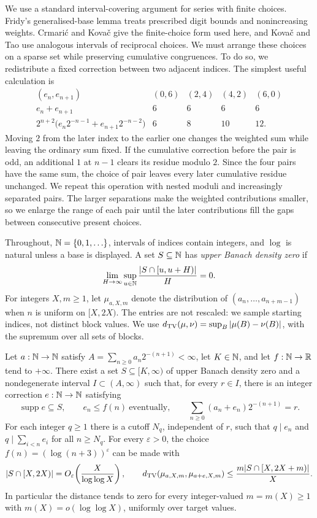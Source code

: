 \documentclass[11pt]{article}
\begin{document}
We use a standard interval-covering argument for series with finite choices.
Fridy's generalised-base lemma \cite[p.~194]{fridy1966} treats prescribed
digit bounds and nonincreasing weights.  Crmari\'{c} and Kova\v{c}
\cite[Lemma~4]{crmarickovac2025} give the finite-choice form used here,
and Kova\v{c} and Tao \cite[Lemma~5.1]{kovactao2024} use analogous
intervals of reciprocal choices.  We must arrange these choices on a sparse set while preserving cumulative
congruences.  To do so, we redistribute a fixed correction between two adjacent
indices.  The simplest useful calculation is
\[
 \begin{array}{c|rrrr}
 (e_n,e_{n+1}) &(0,6)&(2,4)&(4,2)&(6,0)\\
 e_n+e_{n+1} &6&6&6&6\\
 2^{n+2}\bigl(e_n2^{-n-1}+e_{n+1}2^{-n-2}\bigr)&6&8&10&12.
 \end{array}
\]
Moving $2$ from the later index to the earlier one changes the weighted
sum while leaving the ordinary sum fixed.  If the cumulative correction
before the pair is odd, an additional $1$ at $n-1$ clears its residue
modulo $2$.  Since the four pairs have the same sum, the choice of pair leaves every
later cumulative residue unchanged.  We repeat this operation with
nested moduli and increasingly separated pairs.  The larger separations
make the weighted contributions smaller, so we enlarge the range of each
pair until the later contributions fill the gaps between consecutive
present choices.

Throughout, $\mathbb{N}=\{0,1,\ldots\}$, intervals of indices contain integers,
and $\log$ is natural unless a base is displayed.  A set $S\subseteq\mathbb{N}$
has \emph{upper Banach density zero} if
\[
 \lim_{H\to\infty}\sup_{u\in\mathbb{N}}\frac{|S\cap[u,u+H)|}{H}=0.
\]
For integers $X,m\ge1$, let $\mu_{a,X,m}$ denote the distribution of
$(a_n,\ldots,a_{n+m-1})$ when $n$ is uniform on $[X,2X)$.  The entries
are not rescaled: we sample starting indices, not distinct block values.  We use
$d_{\rm TV}(\mu,\nu)=\sup_B|\mu(B)-\nu(B)|$, with the supremum over all sets of blocks.

\begin{proposition}\label{res:sparserationalisation}
Let $a:\mathbb{N}\to\mathbb{N}$ satisfy $A=\sum_{n\ge0}a_n2^{-(n+1)}<\infty$,
let $K\in\mathbb{N}$, and let $f:\mathbb{N}\to\mathbb{R}$ tend to $+\infty$.
There exist a set $S\subseteq[K,\infty)$ of upper Banach density zero
and a nondegenerate interval $I\subset(A,\infty)$ such that, for every
$r\in I$, there is an integer correction $e:\mathbb{N}\to\mathbb{N}$ satisfying
\[
 \operatorname{supp}e\subseteq S,\qquad e_n\le f(n)\ \text{eventually},
 \qquad \sum_{n\ge0}(a_n+e_n)2^{-(n+1)}=r.
\]
For each integer $q\ge1$ there is a cutoff $N_q$, independent of $r$,
such that $q\mid e_n$ and $q\mid\sum_{i<n}e_i$ for all $n\ge N_q$.
For every $\varepsilon>0$, the choice $f(n)=(\log(n+3))^\varepsilon$
can be made with
\[
 |S\cap[X,2X)|=O_\varepsilon\!\left(\frac{X}{\log\log X}\right),
 \qquad
 d_{\rm TV}(\mu_{a,X,m},\mu_{a+e,X,m})
 \le\frac{m|S\cap[X,2X+m)|}{X}.
\]
In particular the distance tends to zero for every integer-valued
$m=m(X)\ge1$ with $m(X)=o(\log\log X)$, uniformly over target values.
\end{proposition}
\end{document}
